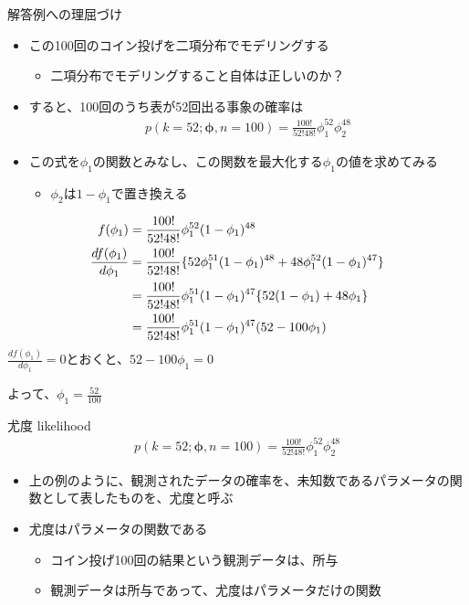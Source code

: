 \documentclass[aspectratio=169,unicode,dvipdfmx,14pt]{beamer}
\begin{document}
\begin{frame}{解答例への理屈づけ}
\begin{itemize}
\item この100回のコイン投げを二項分布でモデリングする
\begin{itemize}
\item 二項分布でモデリングすること自体は正しいのか？
\end{itemize}
\item すると、100回のうち表が52回出る事象の確率は
\begin{align}
p(k=52;\bm{\phi},n=100)=\frac{100!}{52!48!}\phi_1^{52}\phi_2^{48}
\end{align}
\item この式を$\phi_1$の関数とみなし、この関数を最大化する$\phi_1$の値を求めてみる
\begin{itemize}
\item $\phi_2$は$1 - \phi_1$で置き換える
\end{itemize}
\end{itemize}
\end{frame}

\begin{frame}
\begin{align}
f(\phi_1) & = \frac{100!}{52!48!}\phi_1^{52}(1-\phi_1)^{48}
\\
\frac{d f(\phi_1)}{d \phi_1} & = 
\frac{100!}{52!48!} 
\{ 52 \phi_1^{51} (1 - \phi_1)^{48} + 48 \phi_1^{52} (1 - \phi_1)^{47} \}
\notag \\ & =
\frac{100!}{52!48!} \phi_1^{51} (1 - \phi_1)^{47} \{ 52 (1 - \phi_1) + 48 \phi_1 \}
\notag \\ & =
\frac{100!}{52!48!} \phi_1^{51} (1 - \phi_1)^{47} ( 52 - 100 \phi_1 )
\label{eq:ML_derivative}
\end{align}
$\frac{d f(\phi_1)}{d \phi_1} = 0$とおくと、$52 - 100 \phi_1 = 0$

よって、$\phi_1 = \frac{52}{100}$
\end{frame}

\begin{frame}{尤度 likelihood}
\vspace{-.3in}
\begin{align}
p(k=52;\bm{\phi},n=100)=\frac{100!}{52!48!}\phi_1^{52}\phi_2^{48}
\end{align}
\begin{itemize}
\vspace{-.3in}
\item 上の例のように、観測されたデータの確率を、未知数であるパラメータの関数として表したものを、尤度と呼ぶ
\item 尤度はパラメータの関数である
\begin{itemize}
\item コイン投げ100回の結果という観測データは、所与
\item 観測データは所与であって、尤度はパラメータだけの関数
\end{itemize}
\end{itemize}
\end{frame}
\end{document}
